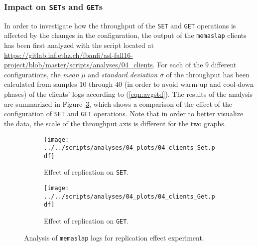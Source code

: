 \documentclass[11pt]{article}
\theoremstyle{definition}
\renewcommand\t\texttt
\begin{document}
\subsubsection{Impact on \t{SET}s and \t{GET}s}

In order to investigate how the throughput of the \t{SET} and \t{GET} operations is affected by the changes in the configuration, the output of the \t{memaslap} clients has been first analyzed with the script located at \url{https://gitlab.inf.ethz.ch/fbanfi/asl-fall16-project/blob/master/scripts/analyses/04_clients}.
For each of the $9$ different configurations, the \emph{mean} $\bar\mu$ and \emph{standard deviation} $\bar\sigma$ of the throughput has been calculated from samples $10$ through $40$ (in order to avoid warm-up and cool-down phases) of the clients' logs according to (\ref{eqn:avgstd}).
The results of the analysis are summarized in Figure~\ref{fig:04_clients}, which shows a comparison of the effect of the configuration of \t{SET} and \t{GET} operations.
Note that in order to better visualize the data, the scale of the throughput axis is different for the two graphs.

\begin{figure}[!h]
    \newcommand\wdt{7.7cm}
    \centering
    \begin{subfigure}[t]{\wdt}
        \centering
        \texttt{[image: ../../scripts/analyses/04\_plots/04\_clients\_Set.pdf]}
        \caption{Effect of replication on \t{SET}.}\label{fig:04_clients-set}
    \end{subfigure}
    \hspace{0.2cm}
    \begin{subfigure}[t]{\wdt}
        \centering
        \texttt{[image: ../../scripts/analyses/04\_plots/04\_clients\_Get.pdf]}
        \caption{Effect of replication on \t{GET}.}\label{fig:04_clients-get}
    \end{subfigure}
    \caption{Analysis of \t{memaslap} logs for replication effect experiment.}
    \label{fig:04_clients}
\end{figure}
\end{document}
